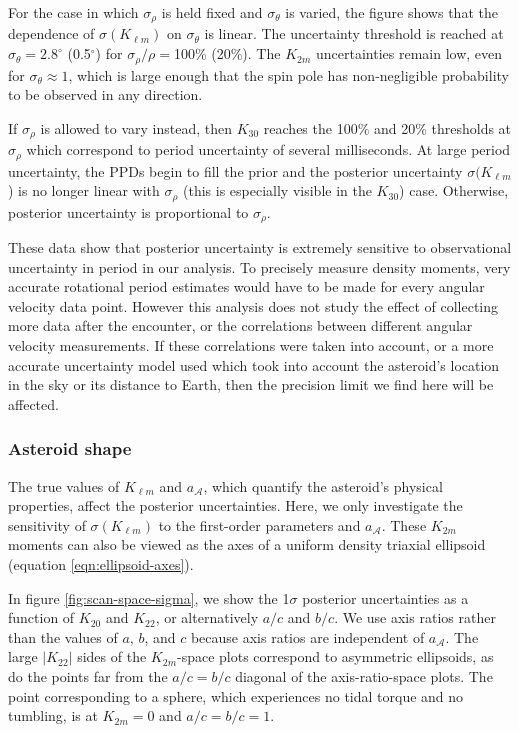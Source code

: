 \documentclass[fleqn,usenatbib]{mnras}
\begin{document}
For the case in which $\sigma_\rho$ is held fixed and $\sigma_\theta$ is varied, the figure shows that the dependence of $\sigma(K_{\ell m})$ on $\sigma_\theta$ is linear. The uncertainty threshold is reached at $\sigma_\theta = 2.8^\circ$ (0.5$^\circ$) for $\sigma_\rho / \rho=$100\% (20\%). The $K_{2m}$ uncertainties remain low, even for $\sigma_\theta \approx 1$, which is large enough that the spin pole has non-negligible probability to be observed in any direction.

If $\sigma_\rho$ is allowed to vary instead, then $K_{30}$ reaches the 100\% and 20\% thresholds at $\sigma_\rho$ which correspond to period uncertainty of several milliseconds. At large period uncertainty, the PPDs begin to fill the prior and the posterior uncertainty $\sigma(K_{\ell m}$) is no longer linear with $\sigma_\rho$ (this is especially visible in the $K_{30}$) case. Otherwise, posterior uncertainty is proportional to $\sigma_\rho$.

These data show that posterior uncertainty is extremely sensitive to observational uncertainty in period in our analysis. To precisely measure density moments, very accurate rotational period estimates would have to be made for every angular velocity data point. However this analysis does not study the effect of collecting more data after the encounter, or the correlations between different angular velocity measurements. If these correlations were taken into account, or a more accurate uncertainty model used which took into account the asteroid's location in the sky or its distance to Earth, then the precision limit we find here will be affected.


\subsubsection{Asteroid shape}
\label{sec:scan-shape}

The true values of $K_{\ell m}$ and $a_\mathcal{A}$, which quantify the asteroid's physical properties, affect the posterior uncertainties. Here, we only investigate the sensitivity of $\sigma(K_{\ell m})$ to the first-order parameters and $a_\mathcal{A}$. These $K_{2m}$ moments can also be viewed as the axes of a uniform density triaxial ellipsoid (equation \ref{eqn:ellipsoid-axes}).

In figure \ref{fig:scan-space-sigma}, we show the 1$\sigma$ posterior uncertainties as a function of $K_{20}$ and $K_{22}$, or alternatively $a/c$ and $b/c$. We use axis ratios rather than the values of $a$, $b$, and $c$ because axis ratios are independent of $a_\mathcal{A}$. The large $|K_{22}|$ sides of the $K_{2m}$-space plots correspond to asymmetric ellipsoids, as do the points far from the $a/c=b/c$ diagonal of the axis-ratio-space plots. The point corresponding to a sphere, which experiences no tidal torque and no tumbling, is at $K_{2m}=0$ and $a/c=b/c=1$.
\end{document}

